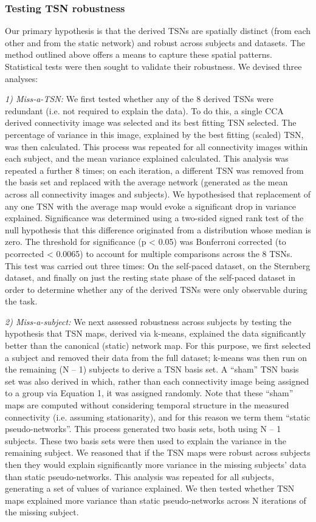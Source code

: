 \subsubsection{Testing TSN robustness}
Our primary hypothesis is that the derived TSNs are spatially distinct (from each other and from the static network) and robust across subjects and datasets. The method outlined above offers a means to capture these spatial patterns. Statistical tests were then sought to validate their robustness. We devised three analyses:

\textit{1) Miss-a-TSN:}
We first tested whether any of the 8 derived TSNs were redundant (i.e. not required to explain the data). To do this, a single CCA derived connectivity image was selected and its best fitting TSN selected. The percentage of variance in this image, explained by the best fitting (scaled) TSN, was then calculated. This process was repeated for all connectivity images within each subject, and the mean variance explained calculated. This analysis was repeated a further 8 times; on each iteration, a different TSN was removed from the basis set and replaced with the average network (generated as the mean across all connectivity images and subjects). We hypothesised that replacement of any one TSN with the average map would evoke a significant drop in variance explained. Significance was determined using a two-sided signed rank test of the null hypothesis that this difference originated from a distribution whose median is zero. The threshold for significance (p < 0.05) was Bonferroni corrected (to pcorrected < 0.0065) to account for multiple comparisons across the 8 TSNs. This test was carried out three times: On the self-paced dataset, on the Sternberg dataset, and finally on just the resting state phase of the self-paced dataset in order to determine whether any of the derived TSNs were only observable during the task.

\textit{2) Miss-a-subject:}
We next assessed robustness across subjects by testing the hypothesis that TSN maps, derived via k-means, explained the data significantly better than the canonical (static) network map. For this purpose, we first selected a subject and removed their data from the full dataset; k-means was then run on the remaining (N – 1) subjects to derive a TSN basis set. A “sham” TSN basis set was also derived in which, rather than each connectivity image being assigned to a group via Equation 1, it was assigned randomly. Note that these “sham” maps are computed without considering temporal structure in the measured connectivity (i.e. assuming stationarity), and for this reason we term them “static pseudo-networks”. This process generated two basis sets, both using N – 1 subjects. These two basis sets were then used to explain the variance in the remaining subject. We reasoned that if the TSN maps were robust across subjects then they would explain significantly more variance in the missing subjects’ data than static pseudo-networks. This analysis was repeated for all subjects, generating a set of values of variance explained. We then tested whether TSN maps explained more variance than static pseudo-networks across N iterations of the missing subject.

